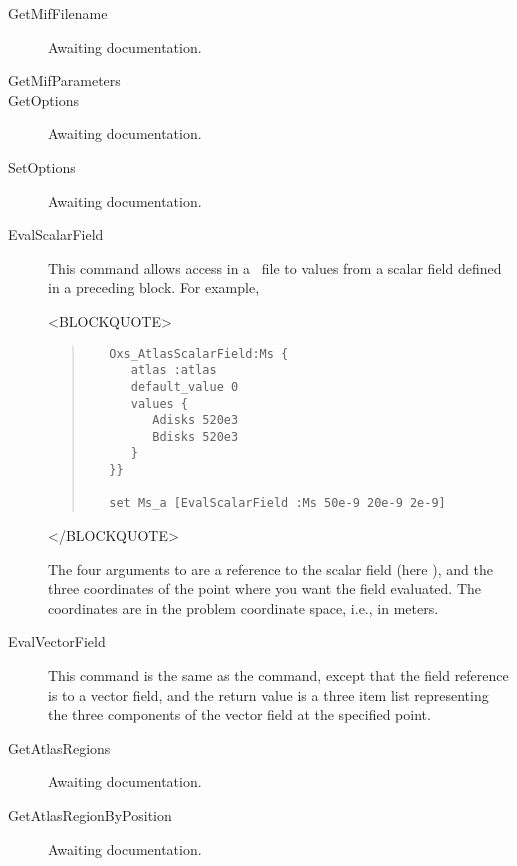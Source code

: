 \begin{description}
\item[GetMifFilename\label{html:mif2GetMifFilename}]
Awaiting documentation.

\item[GetMifParameters\label{html:mif2GetMifParameters}]

\item[GetOptions\label{html:mif2GetOptions}]
Awaiting documentation.

\item[SetOptions\label{html:mif2SetOptions}]
Awaiting documentation.

\item[EvalScalarField\label{html:mif2EvalScalarField}]
This command allows access in a \MIF\ file to values from a scalar field
defined in a preceding  block.  For example,
\begin{rawhtml}<BLOCKQUOTE>\end{rawhtml}
\begin{quote}
\begin{verbatim}
   Oxs_AtlasScalarField:Ms {
      atlas :atlas
      default_value 0
      values {
         Adisks 520e3
         Bdisks 520e3
      }
   }}

   set Ms_a [EvalScalarField :Ms 50e-9 20e-9 2e-9]
\end{verbatim}
\end{quote}
\begin{rawhtml}</BLOCKQUOTE>\end{rawhtml}
The four arguments to  are a reference to the scalar
field (here ), and the three coordinates of the point where you
want the field evaluated.  The coordinates are in the problem coordinate
space, i.e., in meters.

\item[EvalVectorField\label{html:mif2EvalVectorField}]
This command is the same as the  command, except
that the field reference is to a vector field, and the return value is a
three item list representing the three components of the vector field at
the specified point.

\item[GetAtlasRegions\label{html:mif2GetAtlasRegions}]
Awaiting documentation.

\item[GetAtlasRegionByPosition\label{html:mif2GetAtlasRegionByPosition}]
Awaiting documentation.

\end{description}

